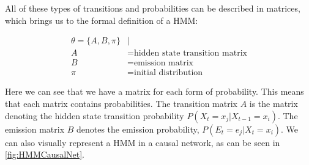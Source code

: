All of these types of transitions and probabilities can be described in matrices, which brings us to the formal definition of a HMM:

\begin{align*}
\theta = \{A,B,\pi\} &|\\
A &= \text{hidden state transition matrix}\\
B &= \text{emission matrix}\\
\pi &= \text{initial distribution}
\end{align*}

Here we can see that we have a matrix for each form of probability. This means that each matrix contains probabilities. The transition matrix $A$ is the matrix denoting the hidden state transition probability $P(X_t=x_j|X_{t-1}=x_i)$. The emission matrix $B$ denotes the emission probability, $P(E_t=e_j|X_t=x_i)$. We can also visually represent a HMM in a causal network, as can be seen in \cref{fig:HMMCausalNet}.

